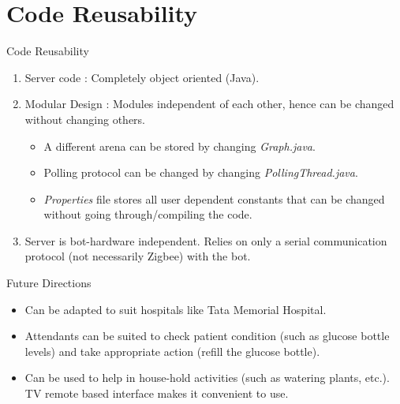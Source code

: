\documentclass{beamer}
\begin{document}
\section{Code Reusability}
\begin{frame}{Code Reusability}
\begin{enumerate} 
\item Server code : Completely object oriented (Java).
\item Modular Design : Modules independent of each other, hence can be changed without changing others.
\begin{itemize}
\item A different arena can be stored by changing \emph{Graph.java}.
\item Polling protocol can be changed by changing \emph{PollingThread.java}.
\item \emph{Properties} file stores all user dependent constants that can be changed without going through/compiling the code.
\end{itemize}
\item Server is bot-hardware independent. Relies on only a serial communication protocol (not necessarily Zigbee) with the bot.
\end{enumerate}
\end{frame}

\begin{frame}{Future Directions}
\begin{itemize} 
\item Can be adapted to suit hospitals like Tata Memorial Hospital.
\item Attendants can be suited to check patient condition (such as glucose bottle levels) and take appropriate action (refill the glucose bottle).
\item Can be used to help in house-hold activities (such as watering plants, etc.). TV remote based interface makes it convenient to use.
\end{itemize}
\end{frame}
\end{document}
